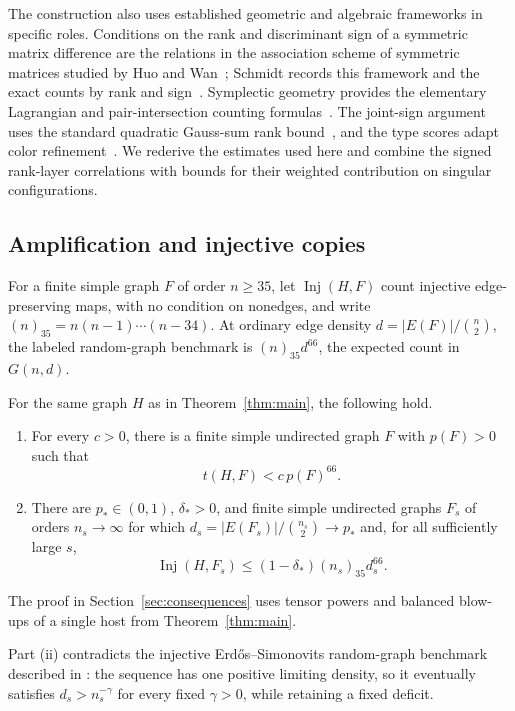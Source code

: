 The construction also uses established geometric and algebraic
frameworks in specific roles. Conditions on the rank and
discriminant sign of a symmetric matrix difference are the relations
in the association scheme of symmetric matrices studied by Huo and
Wan~\cite{huowan1993}; Schmidt records this framework and the exact
counts by rank and sign~\cite[Section~2]{schmidt2015}. Symplectic geometry
provides the elementary Lagrangian and pair-intersection counting
formulas~\cite{taylor1992}.
The joint-sign argument uses the standard quadratic Gauss-sum rank
bound~\cite[Lemma~3.3]{gowerswolf2011}, and the type scores adapt
color refinement~\cite{weisfeilerleman1968,mckay1981}. We rederive
the estimates used here and combine the signed rank-layer correlations
with bounds for their weighted contribution on singular configurations.

\subsection*{Amplification and injective copies}

For a finite simple graph \(F\) of order \(n\ge35\), let
\(\operatorname{Inj}(H,F)\)
count injective edge-preserving maps, with no condition on nonedges,
and write \((n)_{35}=n(n-1)\cdots(n-34)\). At ordinary edge density
\(d=|E(F)|/\binom n2\), the labeled random-graph benchmark is
\((n)_{35}d^{66}\), the expected count in \(G(n,d)\).

\begin{corollary}
\label{cor:amplification}
For the same graph \(H\) as in Theorem~\ref{thm:main}, the following
hold.
\begin{enumerate}[label=(\roman*)]
\item For every \(c>0\), there is a finite simple undirected graph
\(F\) with \(p(F)>0\) such that
\[
t(H,F)<c\,p(F)^{66}.
\]
\item There are \(p_*\in(0,1)\), \(\delta_*>0\), and finite simple
undirected graphs \(F_s\) of orders \(n_s\to\infty\) for which
\(d_s=|E(F_s)|/\binom{n_s}{2}\to p_*\) and, for all sufficiently
large \(s\),
\[
\operatorname{Inj}(H,F_s)
\le(1-\delta_*)(n_s)_{35}d_s^{66}.
\]
\end{enumerate}
\end{corollary}

The proof in Section~\ref{sec:consequences} uses tensor powers and
balanced blow-ups of a single host from Theorem~\ref{thm:main}.

Part (ii) contradicts the injective Erd\H{o}s--Simonovits
random-graph benchmark described in
\cite[Section~1]{conlonfoxsudakov2010}: the sequence has one positive
limiting density, so it eventually satisfies \(d_s>n_s^{-\gamma}\)
for every fixed \(\gamma>0\), while retaining a fixed deficit.

